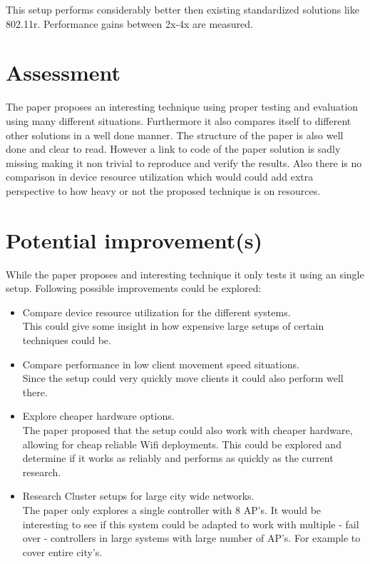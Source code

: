 \documentclass[a4paper]{article}
\begin{document}
This setup performs considerably better then existing standardized solutions like 802.11r. Performance gains between 2x-4x are measured.

\section{Assessment}
The paper proposes an interesting technique using proper testing and evaluation using many different situations. 
Furthermore it also compares itself to different other solutions in a well done manner. 
The structure of the paper is also well done and clear to read. 
However a link to code of the paper solution is sadly missing making it non trivial to reproduce and verify the results. 
Also there is no comparison in device resource utilization which would could add extra perspective to how heavy or not the proposed technique is on resources.

\section{Potential improvement(s)}
While the paper proposes and interesting technique it only tests it using an single setup.
Following possible improvements could be explored:
\begin{itemize}
    \item Compare device resource utilization for the different systems. \\
    This could give some insight in how expensive large setups of certain techniques could be.
    \item Compare performance in low client movement speed situations.\\
    Since the setup could very quickly move clients it could also perform well there.
    \item Explore cheaper hardware options.\\
    The paper proposed that the setup could also work with cheaper hardware, allowing for cheap reliable Wifi deployments. This could be explored and determine if it works as reliably and performs as quickly as the current research.
    \item Research Cluster setups for large city wide networks.\\
    The paper only explores a single controller with 8 AP's. It would be interesting to see if this system could be adapted to work with multiple - fail over - controllers in large systems with large number of AP's. For example to cover entire city's.
\end{itemize}



\end{document}
